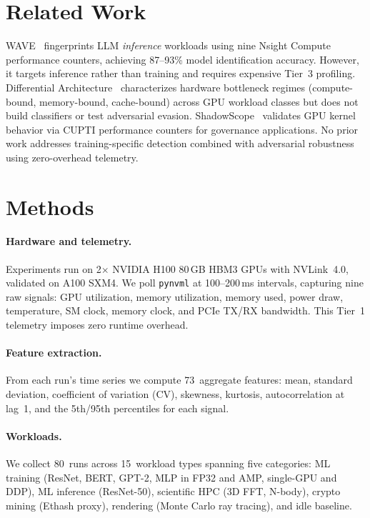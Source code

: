 \documentclass[midterm]{sparreport}
\begin{document}
\section{Related Work}

WAVE~\cite{xu2026wave} fingerprints LLM \emph{inference} workloads using nine Nsight Compute performance counters, achieving 87--93\% model identification accuracy.
However, it targets inference rather than training and requires expensive Tier~3 profiling.
Differential Architecture~\cite{anonymous2026differential} characterizes hardware bottleneck regimes (compute-bound, memory-bound, cache-bound) across GPU workload classes but does not build classifiers or test adversarial evasion.
ShadowScope~\cite{jackowski2025shadowscope} validates GPU kernel behavior via CUPTI performance counters for governance applications.
No prior work addresses training-specific detection combined with adversarial robustness using zero-overhead telemetry.

\section{Methods}

\paragraph{Hardware and telemetry.}
Experiments run on 2$\times$ NVIDIA H100 80\,GB HBM3 GPUs with NVLink~4.0, validated on A100 SXM4.
We poll \texttt{pynvml} at 100--200\,ms intervals, capturing nine raw signals: GPU utilization, memory utilization, memory used, power draw, temperature, SM clock, memory clock, and PCIe TX/RX bandwidth.
This Tier~1 telemetry imposes zero runtime overhead.

\paragraph{Feature extraction.}
From each run's time series we compute 73~aggregate features: mean, standard deviation, coefficient of variation (CV), skewness, kurtosis, autocorrelation at lag~1, and the 5th/95th percentiles for each signal.

\paragraph{Workloads.}
We collect 80~runs across 15~workload types spanning five categories: ML training (ResNet, BERT, GPT-2, MLP in FP32 and AMP, single-GPU and DDP), ML inference (ResNet-50), scientific HPC (3D FFT, N-body), crypto mining (Ethash proxy), rendering (Monte Carlo ray tracing), and idle baseline.
\end{document}

